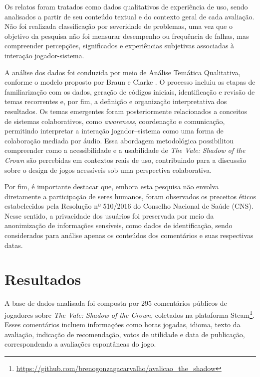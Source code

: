 \documentclass[12pt]{article}
\begin{document}
{{Os relatos foram tratados como dados qualitativos de experiência de uso, sendo analisados a partir de seu conteúdo textual e do contexto geral de cada avaliação. Não foi realizada classificação por severidade de problemas, uma vez que o objetivo da pesquisa não foi mensurar desempenho ou frequência de falhas, mas compreender percepções, significados e experiências subjetivas associadas à interação jogador-sistema.

A análise dos dados foi conduzida por meio de Análise Temática Qualitativa, conforme o modelo proposto por Braun e Clarke \cite{terry2017thematic}. O processo incluiu as etapas de familiarização com os dados, geração de códigos iniciais, identificação e revisão de temas recorrentes e, por fim, a definição e organização interpretativa dos resultados. Os temas emergentes foram posteriormente relacionados a conceitos de sistemas colaborativos, como \textit{awareness}, coordenação e comunicação, permitindo interpretar a interação jogador--sistema como uma forma de colaboração mediada por áudio. Essa abordagem metodológica possibilitou compreender como a acessibilidade e a usabilidade de \textit{The Vale: Shadow of the Crown} são percebidas em contextos reais de uso, contribuindo para a discussão sobre o design de jogos acessíveis sob uma perspectiva colaborativa.

Por fim, é importante destacar que, embora esta pesquisa não envolva diretamente a participação de seres humanos, foram observados os preceitos éticos estabelecidos pela Resolução nº 510/2016 do Conselho Nacional de Saúde (CNS). Nesse sentido, a privacidade dos usuários foi preservada por meio da anonimização de informações sensíveis, como dados de identificação, sendo considerados para análise apenas os conteúdos dos comentários e suas respectivas datas.

\section{Resultados}

A base de dados analisada foi composta por 295 comentários públicos de jogadores sobre \textit{The Vale: Shadow of the Crown}, coletados na plataforma Steam\footnote{\url{https://github.com/brenogonzagacarvalho/avalicao_the_shadow}}. Esses comentários incluem informações como horas jogadas, idioma, texto da avaliação, indicação de recomendação, votos de utilidade e data de publicação, correspondendo a avaliações espontâneas do jogo.

}}
\end{document}
